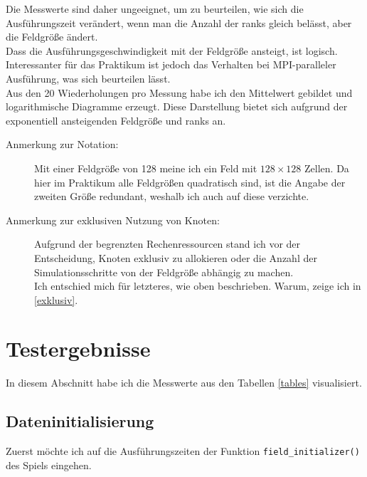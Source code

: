 \documentclass[german,plainarticle,hyperref,utf8]{zihpub}
\begin{document}
	Die Messwerte sind daher ungeeignet, um zu beurteilen, wie sich die Ausführungszeit verändert, wenn man die Anzahl der ranks gleich belässt, aber die Feldgröße ändert.\\
	Dass die Ausführungsgeschwindigkeit mit der Feldgröße ansteigt, ist logisch. Interessanter für das Praktikum ist jedoch das Verhalten bei MPI-paralleler Ausführung, was sich beurteilen lässt.\\
	
	Aus den 20 Wiederholungen pro Messung habe ich den Mittelwert gebildet und logarithmische Diagramme erzeugt. Diese Darstellung bietet sich aufgrund der exponentiell ansteigenden Feldgröße und ranks an.
	\begin{description}
		\item[Anmerkung zur Notation:] Mit einer Feldgröße von 128 meine ich ein Feld mit $128\times 128$ Zellen. Da hier im Praktikum alle Feldgrößen quadratisch sind, ist die Angabe der zweiten Größe redundant, weshalb ich auch auf diese verzichte.
		\item[Anmerkung zur exklusiven Nutzung von Knoten:] Aufgrund der begrenzten Rechenressourcen stand ich vor der Entscheidung, Knoten exklusiv zu allokieren oder die Anzahl der Simulationsschritte von der Feldgröße abhängig zu machen.\\
		Ich entschied mich für letzteres, wie oben beschrieben. Warum, zeige ich in \ref{exklusiv}.
	\end{description}

	\newpage
	\section{Testergebnisse} \label{erg}
	In diesem Abschnitt habe ich die Messwerte aus den Tabellen \ref{tables} visualisiert.
	\subsection{Dateninitialisierung}
	Zuerst möchte ich auf die Ausführungszeiten der Funktion \texttt{field\_initializer()} des Spiels eingehen.\\
	
\end{document}
